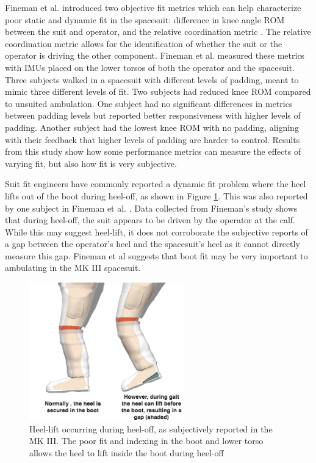 \documentclass[defaultstyle,11pt]{comps}
\begin{document}
Fineman et al. \citep{Fineman2018} introduced two objective fit metrics which can help characterize poor static and dynamic fit in the spacesuit: difference in knee angle ROM between the suit and operator, and the relative coordination metric \citep{Fineman2017a}.
The relative coordination metric allows for the identification of whether the suit or the operator is driving the other component.
Fineman et al. \citep{Fineman2018} measured these metrics with IMUs placed on the lower torsos of both the operator and the spacesuit.
Three subjects walked in a spacesuit with different levels of padding, meant to mimic three different levels of fit.
Two subjects had reduced knee ROM compared to unsuited ambulation.
One subject had no significant differences in metrics between padding levels but reported better responsiveness with higher levels of padding.
Another subject had the lowest knee ROM with no padding, aligning with their feedback that higher levels of padding are harder to control.
Results from this study show how some performance metrics can measure the effects of varying fit, but also how fit is very subjective.

Suit fit engineers have commonly reported a dynamic fit problem where the heel lifts out of the boot during heel-off, as shown in Figure \ref{fig:B-HeelLift}.
This was also reported by one subject in Fineman et al. \citep{Fineman2018}.
Data collected from Fineman's study shows that during heel-off, the suit appears to be driven by the operator at the calf.
While this may suggest heel-lift, it does not corroborate the subjective reports of a gap between the operator's heel and the spacesuit's heel as it cannot directly measure this gap.
Fineman et al \citep{Fineman2018} suggests that boot fit may be very important to ambulating in the MK III spacesuit.

\begin{figure}
\hypertarget{fig:B-HeelLift}{%
\centering
\includegraphics[width=0.6\textwidth,height=\textheight]{../fig/Background/HeelLift.png}
\caption{Heel-lift occurring during heel-off, as subjectively reported in the MK III. The poor fit and indexing in the boot and lower torso allows the heel to lift inside the boot during heel-off}\label{fig:B-HeelLift}
}
\end{figure}
\end{document}
